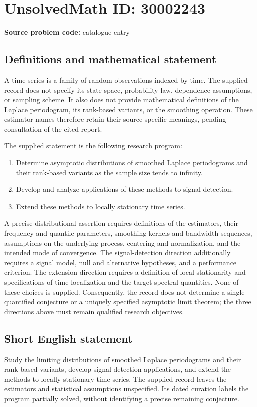 \documentclass[11pt]{article}
\begin{document}
\section*{UnsolvedMath ID: 30002243}
\textbf{Source problem code:} catalogue entry
\subsection{Definitions and mathematical statement}
A time series is a family of random observations indexed by time. The supplied record does not specify its state space, probability law, dependence assumptions, or sampling scheme. It also does not provide mathematical definitions of the Laplace periodogram, its rank-based variants, or the smoothing operation. These estimator names therefore retain their source-specific meanings, pending consultation of the cited report.

The supplied statement is the following research program:
\begin{enumerate}
\item Determine asymptotic distributions of smoothed Laplace periodograms and their rank-based variants as the sample size tends to infinity.
\item Develop and analyze applications of these methods to signal detection.
\item Extend these methods to locally stationary time series.
\end{enumerate}

A precise distributional assertion requires definitions of the estimators, their frequency and quantile parameters, smoothing kernels and bandwidth sequences, assumptions on the underlying process, centering and normalization, and the intended mode of convergence. The signal-detection direction additionally requires a signal model, null and alternative hypotheses, and a performance criterion. The extension direction requires a definition of local stationarity and specifications of time localization and the target spectral quantities. None of these choices is supplied. Consequently, the record does not determine a single quantified conjecture or a uniquely specified asymptotic limit theorem; the three directions above must remain qualified research objectives.
\subsection{Short English statement}
Study the limiting distributions of smoothed Laplace periodograms and their rank-based variants, develop signal-detection applications, and extend the methods to locally stationary time series. The supplied record leaves the estimators and statistical assumptions unspecified. Its dated curation labels the program partially solved, without identifying a precise remaining conjecture.
\end{document}
